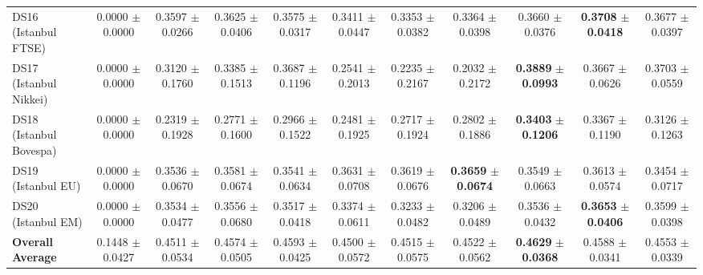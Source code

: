 \begin{table}[t]
{{\begin{tabular}{lcccccccccc}
DS16 (Istanbul FTSE) & 0.0000 $\pm$ 0.0000 & 0.3597 $\pm$ 0.0266 & 0.3625 $\pm$ 0.0406 & 0.3575 $\pm$ 0.0317 & 0.3411 $\pm$ 0.0447 & 0.3353 $\pm$ 0.0382 & 0.3364 $\pm$ 0.0398 & 0.3660 $\pm$ 0.0376 & \textbf{0.3708} $\pm$ \textbf{0.0418} & 0.3677 $\pm$ 0.0397 \\
DS17 (Istanbul Nikkei) & 0.0000 $\pm$ 0.0000 & 0.3120 $\pm$ 0.1760 & 0.3385 $\pm$ 0.1513 & 0.3687 $\pm$ 0.1196 & 0.2541 $\pm$ 0.2013 & 0.2235 $\pm$ 0.2167 & 0.2032 $\pm$ 0.2172 & \textbf{0.3889} $\pm$ \textbf{0.0993} & 0.3667 $\pm$ 0.0626 & 0.3703 $\pm$ 0.0559 \\
DS18 (Istanbul Bovespa) & 0.0000 $\pm$ 0.0000 & 0.2319 $\pm$ 0.1928 & 0.2771 $\pm$ 0.1600 & 0.2966 $\pm$ 0.1522 & 0.2481 $\pm$ 0.1925 & 0.2717 $\pm$ 0.1924 & 0.2802 $\pm$ 0.1886 & \textbf{0.3403} $\pm$ \textbf{0.1206} & 0.3367 $\pm$ 0.1190 & 0.3126 $\pm$ 0.1263 \\
DS19 (Istanbul EU) & 0.0000 $\pm$ 0.0000 & 0.3536 $\pm$ 0.0670 & 0.3581 $\pm$ 0.0674 & 0.3541 $\pm$ 0.0634 & 0.3631 $\pm$ 0.0708 & 0.3619 $\pm$ 0.0676 & \textbf{0.3659} $\pm$ \textbf{0.0674} & 0.3549 $\pm$ 0.0663 & 0.3613 $\pm$ 0.0574 & 0.3454 $\pm$ 0.0717 \\
DS20 (Istanbul EM) & 0.0000 $\pm$ 0.0000 & 0.3534 $\pm$ 0.0477 & 0.3556 $\pm$ 0.0680 & 0.3517 $\pm$ 0.0418 & 0.3374 $\pm$ 0.0611 & 0.3233 $\pm$ 0.0482 & 0.3206 $\pm$ 0.0489 & 0.3536 $\pm$ 0.0432 & \textbf{0.3653} $\pm$ \textbf{0.0406} & 0.3599 $\pm$ 0.0398 \\
\midrule
\textbf{Overall Average} & 0.1448 $\pm$ 0.0427 & 0.4511 $\pm$ 0.0534 & 0.4574 $\pm$ 0.0505 & 0.4593 $\pm$ 0.0425 & 0.4500 $\pm$ 0.0572 & 0.4515 $\pm$ 0.0575 & 0.4522 $\pm$ 0.0562 & \textbf{0.4629} $\pm$ \textbf{0.0368} & 0.4588 $\pm$ 0.0341 & 0.4553 $\pm$ 0.0339 \\
\bottomrule
\end{tabular}%
}%
}
\end{table}
